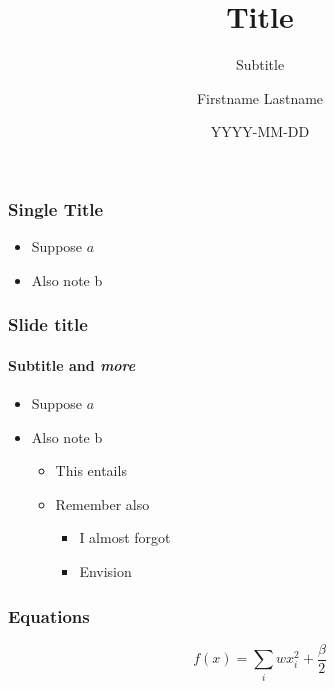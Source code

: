 \documentclass[aspectratio=1610]{beamer}
\title{Title}
\subtitle{Subtitle}
\author{Firstname Lastname}
\date{YYYY-MM-DD}
\institute{Center}
\begin{document}
\maketitle

\begin{frame}
    \frametitle{Single Title}
    
    \begin{itemize}
        \item Suppose $a$
        \item Also note b
    \end{itemize}
\end{frame}

\begin{frame}
    \frametitle{Slide title}
    \framesubtitle{\textbf{Subtitle} and \emph{more}}
    
    \begin{itemize}
        \item Suppose $a$
        \item Also note b
        \begin{itemize}
            \item This entails
            \item Remember also
            \begin{itemize}
                \item I almost forgot
                \item Envision
            \end{itemize}
        \end{itemize}
    \end{itemize}
\end{frame}


\begin{frame}
\frametitle{Equations}

    \begin{equation*}
        f(x) = \sum_i wx_i^2 + \frac{\beta}{2}
    \end{equation*}
\end{frame}
\end{document}
